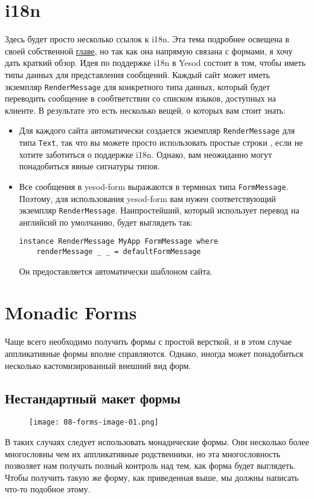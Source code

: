 \section{i18n}
Здесь будет просто несколько ссылок к i18n. Эта тема подробнее освещена в своей
собственной  \hyperref[ch:i18n]{главе},
но так как она напрямую связана с формами, я хочу дать краткий обзор. 
Идея по поддержке i18n в Yesod состоит в том, чтобы иметь типы данных для представления
сообщений. Каждый сайт может иметь экземпляр \lstinline'RenderMessage' для конкретного
типа данных, который будет переводить сообщение в сообтветствии со списком языков,
доступных на клиенте. В результате это есть несколько вещей, о которых вам стоит знать:
\begin{itemize}
\item  Для каждого сайта автоматически создается экземпляр \lstinline'RenderMessage' для
типа \lstinline'Text', так что вы можете просто использовать простые строки , если не
хотите заботиться о поддержке i18n. Однако, вам неожиданно могут понадобиться явные
сигнатуры типов.
\item Все сообщения в yesod-form выражаются в терминах типа \lstinline'FormMessage'.
Поэтому, для использования yesod-form вам нужен соответствующий экземпляр 
\lstinline'RenderMessage'. Наипростейший, который использует перевод на английсий по
умолчанию, будет выглядеть так:
\begin{lstlisting}
instance RenderMessage MyApp FormMessage where
    renderMessage _ _ = defaultFormMessage
\end{lstlisting}
Он предоставляется автоматически шаблоном сайта.
\end{itemize}

\section{Monadic Forms}
Чаще всего необходимо получить формы с простой версткой, и в этом случае аппликативные формы 
вполне справляются. Однако, иногда может понадобиться несколько кастомизированный 
внешний вид форм.

\subsection{Нестандартный макет формы}
\begin{figure}[tbph]
  \centering
  \caption{}
  \texttt{[image: 08-forms-image-01.png]}
\end{figure}
В таких случаях следует использовать монадические формы. Они несколько более 
многословны чем их аппликативные родственники, но эта многословность позволяет нам
получать полный контроль над тем, как форма будет выглядеть. Чтобы получить такую же
форму, как приведенная выше, мы должны написать что-то подобное этому.

